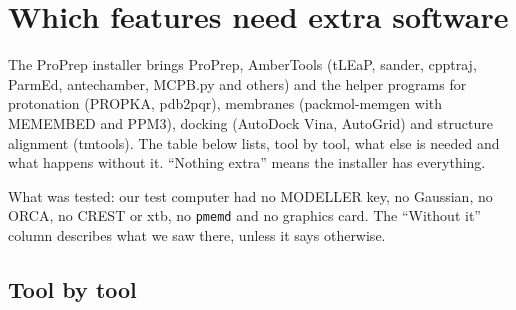 \chapter{Which features need extra software}
\label{app:software}

The ProPrep installer brings ProPrep, AmberTools (tLEaP, sander, cpptraj,
ParmEd, antechamber, MCPB.py and others) and the helper programs for
protonation (PROPKA, pdb2pqr), membranes (packmol-memgen with MEMEMBED and
PPM3), docking (AutoDock Vina, AutoGrid) and structure alignment (tmtools). The
table below lists, tool by tool, what else is needed and what happens without
it. ``Nothing extra'' means the installer has everything.

What was tested: our test computer had no MODELLER key, no Gaussian, no ORCA,
no CREST or xtb, no \texttt{pmemd} and no graphics card. The ``Without it''
column describes what we saw there, unless it says otherwise.

\section{Tool by tool}
\label{sec:software-table}

